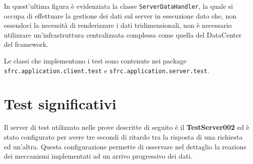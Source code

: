 In quest'ultima figura \`e evidenziata la classe \texttt{ServerDataHandler}, la quale si occupa di effettuare la gestione dei dati sul server in esecuzione dato che, non essendoci la necessit\`a di renderizzare i dati tridimensionali, non \`e necessario utilizzare un'infrastruttura centralizzata complessa come quella del DataCenter del framework.

Le classi che implementano i test sono contenute nei package \\\texttt{sfrc.application.client.test} e \texttt{sfrc.application.server.test}.

\section{Test significativi}
\label{sec:test}
Il server di test utilizzato nelle prove descritte di seguito \`e il \textbf{TestServer002} ed \`e stato configurato per avere tre secondi di ritardo tra la risposta di una richiesta ed un'altra. Questa configurazione permette di osservare nel dettaglio la reazione dei meccanismi implementati ad un arrivo progressivo dei dati.

